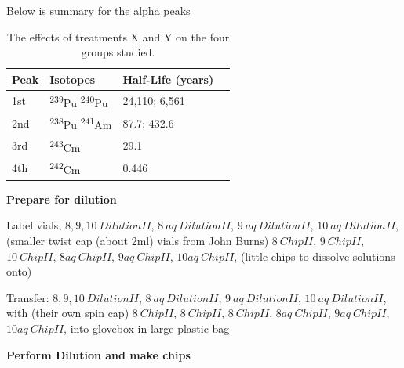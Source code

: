 \documentclass[idxtotoc,hyperref,openany,oneside]{labbook} %
\newcommand{\cmark}{\ding{51}}%
\newcommand{\done}{\rlap{$\square$}{\raisebox{2pt}{\large\hspace{1pt}\cmark}}%
  \hspace{-2.5pt}}
\newcommand{\tss}{\textsuperscript}
\begin{document}
Below is summary for the alpha peaks 
\begin{table}[H]
\begin{center}
\begin{tabular}{l l l l}
\toprule
\textbf{Peak} & \textbf{Isotopes}& \textbf{Half-Life (years)} \\
\toprule
1st & \tss{239}Pu \tss{240}Pu & 24,110; 6,561\\
2nd & \tss{238}Pu \tss{241}Am & 87.7; 432.6\\
3rd & \tss{243}Cm & 29.1\\
4th & \tss{242}Cm & 0.446\\
\bottomrule
\end{tabular}
\caption{The effects of treatments X and Y on the four groups studied.}
\label{tab:treatments_xy}
\end{center}
\end{table}



\textbf{Prepare for dilution}
\begin{todolist}
\item[\done]{Label vials,
  $\boxed{8,9,10\ DilutionII}$,
  $\boxed{8\ aq\ DilutionII}$,
  $\boxed{9\ aq\ DilutionII}$,
  $\boxed{10\ aq\ DilutionII}$,
  (smaller twist cap (about 2ml) vials from John Burns)
  $\boxed{8\ ChipII}$, $\boxed{9\ ChipII}$,
  $\boxed{10\ ChipII}$,
  $\boxed{8aq\ ChipII}$,
  $\boxed{9aq\ ChipII}$,
  $\boxed{10aq\ ChipII}$,
  (little chips to dissolve solutions onto)}
\item[\done]{Transfer:
  $\boxed{8,9,10\ DilutionII}$,
  $\boxed{8\ aq\ DilutionII}$,
  $\boxed{9\ aq\ DilutionII}$,
  $\boxed{10\ aq\ DilutionII}$,
  with
  (their own spin cap)
  $\boxed{8\ ChipII}$, $\boxed{8\ ChipII}$,
  $\boxed{8\ ChipII}$,
  $\boxed{8aq\ ChipII}$,
  $\boxed{9aq\ ChipII}$,
  $\boxed{10aq\ ChipII}$, into glovebox in large plastic bag}
\end{todolist}

\textbf{Perform Dilution and make chips}
\end{document}

